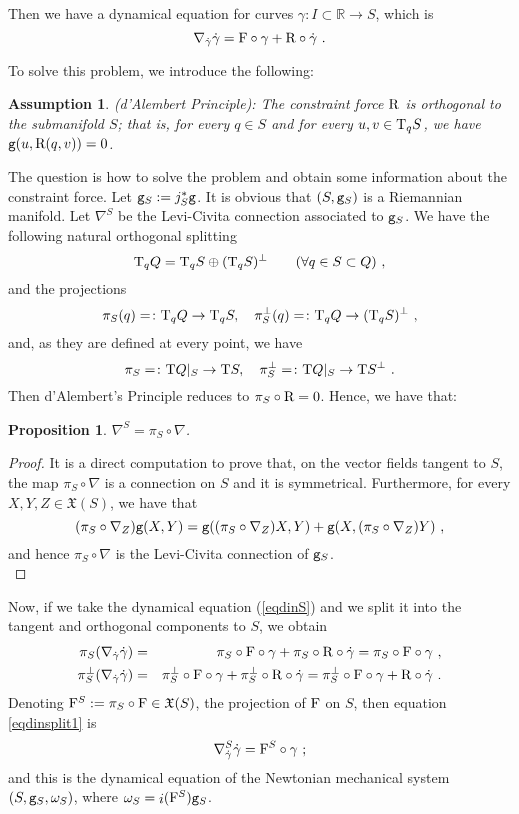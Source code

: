 \documentclass[12pt]{report}
\newtheorem{prop}[teor]{Proposition}
\newtheorem{assump}[teor]{Assumption}
\def\beq{\begin{equation}}
\def\eeq{\end{equation}}
\def\bea{\begin{eqnarray}}
\def\eea{\end{eqnarray}}
\def\qed{\ifvmode\removelastskip\fi
{\unskip\nobreak\hfil\penalty50\hbox{}\nobreak\hfil
\hbox{\vrule height1.2ex width1.2ex}\parfillskip=0pt
\finalhyphendemerits=0 \par\smallskip}}
\def\vf{\mathfrak X}
\def\Real{\mathbb{R}}
\def\Tan{{\rm T}}
\def\inn{\mathop{i}\nolimits}
\begin{document}
Then we have a dynamical equation for curves
$\gamma\colon I\subset\Real\to S$, which is
\beq
\nabla_{\dot\gamma}\dot\gamma ={\rm F}\circ\gamma+{\rm R}\circ\dot\gamma \ .
\label{eqdinS}
\eeq

To solve this problem, we introduce the following:

\begin{assump}
{\rm (d'Alembert Principle}):
The constraint force ${\rm R}$ is orthogonal to the submanifold $S$;
that is, for every $q\in S$ and for every $ u,v\in\Tan_qS$, we have  ${\tt g}(u,{\rm R}(q,v))=0$.
\end{assump}

The question is how to solve the problem and obtain some information about the constraint force.
Let ${\tt g}_S:=j_S^*{\tt g}$. It is obvious that $(S,{\tt g}_S)$ is a Riemannian manifold.
Let $\nabla^S$ be the Levi-Civita connection associated to ${\tt g}_S$.
We have the following natural orthogonal splitting 
$$
\Tan_qQ=\Tan_qS\oplus (\Tan_qS)^\perp \qquad (\forall q\in S\subset Q) \ ,
$$
and the projections
$$
\pi_S(q)=\colon \Tan_qQ\rightarrow\Tan_qS
,\quad
\pi^\perp_S(q)=\colon \Tan_qQ\rightarrow (\Tan_qS)^\perp \ ,
$$
and, as they are defined at every point, we have
$$
\pi_S=\colon \Tan Q\vert_S\rightarrow\Tan S
,\quad
\pi^\perp_S=\colon \Tan Q\vert_S\rightarrow \Tan S^\perp \ .
$$
Then d'Alembert's Principle reduces to $\pi_S\circ{\rm R}=0$.
Hence, we have that:

\begin{prop}
$\nabla^S=\pi_S\circ\nabla$.
\end{prop}
\begin{proof}
It is a direct computation to prove that, on the vector fields tangent to $S$, the map $\pi_S\circ\nabla$ is a connection on $S$ and it is symmetrical. 
Furthermore, for every $X,Y,Z\in\vf (S)$, we have that
$$
(\pi_S\circ\nabla_Z){\tt g}(X,Y)={\tt g}((\pi_S\circ\nabla_Z)X,Y)+{\tt g}(X,(\pi_S\circ\nabla_Z)Y) \ ,
$$
and hence $\pi_S\circ\nabla$ is the Levi-Civita connection of ${\tt g}_S$.
\\ \qed \end{proof}

Now, if we take the dynamical equation (\ref{eqdinS}) and we split it into the tangent and orthogonal  components to $S$, we obtain
\bea
\pi_S(\nabla_{\dot\gamma}\dot\gamma) &=&
\pi_S\circ{\rm F}\circ\gamma+\pi_S\circ{\rm R}\circ\dot\gamma =
\pi_S\circ{\rm F}\circ\gamma \ ,
\label{eqdinsplit1}  \\
\pi_S^\perp(\nabla_{\dot\gamma}\dot\gamma) &=&
\pi_S^\perp\circ{\rm F}\circ\gamma+\pi_S^\perp\circ{\rm R}\circ\dot\gamma =
\pi_S^\perp\circ{\rm F}\circ\gamma +{\rm R}\circ\dot\gamma \ .
\label{eqdinsplit2}
\eea
Denoting ${\rm F}^S:=\pi_S\circ{\rm F}\in\vf (S)$, the projection of
 ${\rm F}$ on $S$, then equation \eqref{eqdinsplit1} is 
 \beq
 \nabla^S_{\dot\gamma}\dot\gamma = {\rm F}^S\circ\gamma \ ;
\label{eqdinresS}
\eeq
and this is the dynamical equation of the Newtonian mechanical system
$(S,{\tt g}_S,\omega_S)$, where $\omega_S=\inn({\rm F}^S){\tt g}_S$.
\end{document}
